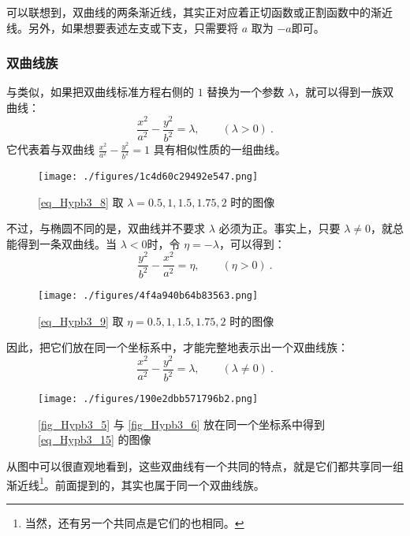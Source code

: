 可以联想到，双曲线的两条渐近线，其实正对应着正切函数或正割函数中的渐近线。另外，如果想要表述左支或下支，只需要将 $a$ 取为 $-a$即可。

\subsubsection{双曲线族}

与类似，如果把双曲线标准方程右侧的 $1$ 替换为一个参数 $\lambda$，就可以得到一族双曲线：
\begin{equation}\label{eq_Hypb3_8}
\frac{x^2}{a^2} - \frac{y^2}{b^2} = \lambda,\qquad(\lambda>0)~.
\end{equation}
它代表着与双曲线 $\displaystyle\frac{x^2}{a^2} - \frac{y^2}{b^2} = 1$ 具有相似性质的一组曲线。

\begin{figure}[ht]
\centering
\texttt{[image: ./figures/1c4d60c29492e547.png]}
\caption{\autoref{eq_Hypb3_8} 取 $\lambda=0.5,1,1.5,1.75,2$ 时的图像} \label{fig_Hypb3_5}
\end{figure}

不过，与椭圆不同的是，双曲线并不要求 $\lambda$ 必须为正。事实上，只要 $\lambda\neq0$，就总能得到一条双曲线。当 $\lambda<0$时，令 $\eta=-\lambda$，可以得到：
\begin{equation}\label{eq_Hypb3_9}
\frac{y^2}{b^2}-\frac{x^2}{a^2} = \eta,\qquad(\eta>0)~.
\end{equation}

\begin{figure}[ht]
\centering
\texttt{[image: ./figures/4f4a940b64b83563.png]}
\caption{\autoref{eq_Hypb3_9} 取 $\eta=0.5,1,1.5,1.75,2$ 时的图像} \label{fig_Hypb3_6}
\end{figure}

因此，把它们放在同一个坐标系中，才能完整地表示出一个双曲线族：
\begin{equation}\label{eq_Hypb3_15}
\frac{x^2}{a^2} - \frac{y^2}{b^2} = \lambda,\qquad(\lambda\neq0)~.
\end{equation}

\begin{figure}[ht]
\centering
\texttt{[image: ./figures/190e2dbb571796b2.png]}
\caption{\autoref{fig_Hypb3_5} 与 \autoref{fig_Hypb3_6} 放在同一个坐标系中得到 \autoref{eq_Hypb3_15} 的图像} \label{fig_Hypb3_7}
\end{figure}

从图中可以很直观地看到，这些双曲线有一个共同的特点，就是它们都共享同一组渐近线\footnote{当然，还有另一个共同点是它们的也相同。}。前面提到的，其实也属于同一个双曲线族。

